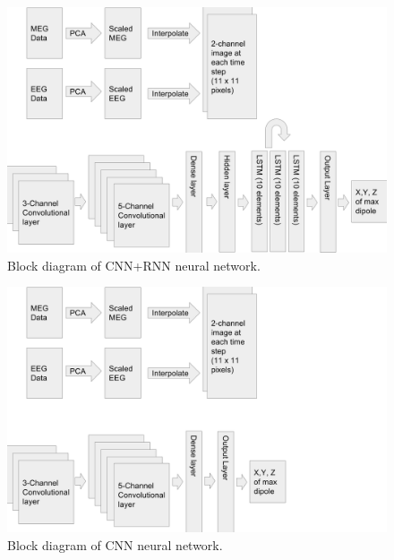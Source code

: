\documentclass[journal]{IEEEtran}
\begin{document}
\begin{figure}[!t]
\centering
\includegraphics[width=7in]{cnnrnn}
\caption{Block diagram of CNN+RNN neural network.}
\label{fig_cnnrnn}
\end{figure}
\begin{figure}[!t]
\centering
\includegraphics[width=7in]{cnn}
\caption{Block diagram of CNN neural network.}
\label{fig_cnn}
\end{figure}
\end{document}
